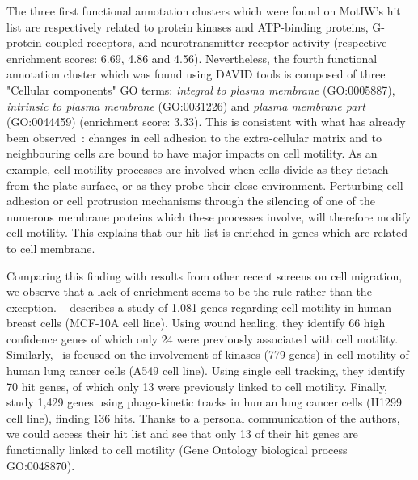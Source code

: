 The three first functional annotation clusters which were found on
MotIW's hit list are respectively related to protein kinases and
ATP-binding proteins, G-protein coupled receptors, and
neurotransmitter receptor activity (respective enrichment scores: 6.69, 4.86 and 4.56). Nevertheless, the fourth
functional annotation cluster which was found using DAVID tools is
composed of three "Cellular components" GO terms: \textit{integral to
  plasma membrane} (GO:0005887), \textit{intrinsic to plasma membrane}
(GO:0031226) and \textit{plasma membrane part} (GO:0044459) (enrichment score: 3.33). This is
consistent with what has already been observed~\cite{pmid18213366}:
changes in cell adhesion to the extra-cellular matrix and to
neighbouring cells are bound to have major impacts on cell
motility. As an example, cell motility processes are involved when
cells divide as they detach from the plate surface, or as they probe
their close environment. Perturbing cell adhesion or cell protrusion
mechanisms through the silencing of one of the numerous membrane proteins which these processes involve, will therefore modify cell motility. This explains that our hit list is enriched in
genes which are related to cell membrane. 

%

Comparing this finding with results from other recent screens on cell
migration, we observe that a lack of enrichment seems to be the rule
rather than the exception. ~\cite{pmid19160483} describes
a study of 1,081 genes regarding cell motility in human breast cells
(MCF-10A cell line). Using wound healing, they identify 66 high
confidence genes of which only 24 were previously associated with cell
motility. Similarly,~\cite{pmid21423205} is focused on the involvement
of kinases (779 genes) in cell motility of human lung cancer cells
(A549 cell line). Using single cell tracking, they identify 70 hit
genes, of which only 13 were previously linked to cell
motility. Finally,~\cite{pmid25774502} study 1,429 genes using
phago-kinetic tracks in human lung cancer cells (H1299 cell line),
finding 136 hits. Thanks to a personal communication of the authors,
we could access their hit list and see that only 13 of their hit genes
are functionally linked to cell motility (Gene Ontology biological
process GO:0048870). %

